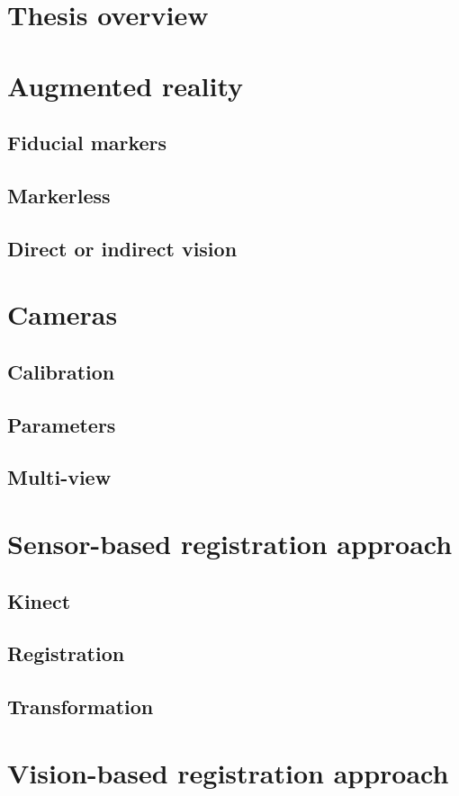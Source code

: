 \documentclass[msc, a4paper, classic, pt]{ufbathesis}
\begin{document}
\section{Thesis overview}

\section{Augmented reality}
\subsection{Fiducial markers}
\subsection{Markerless}
\subsection{Direct or indirect vision}
\section{Cameras}
\subsection{Calibration}
\subsection{Parameters}
\subsection{Multi-view}
\section{Sensor-based registration approach}
\subsection{Kinect}
\subsection{Registration}
\subsection{Transformation}
\section{Vision-based registration approach}
\end{document}
